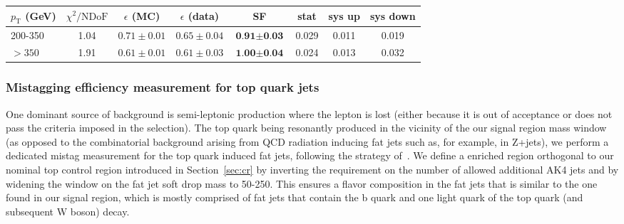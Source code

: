 \begin{table}[htbH]\footnotesize
  \begin{center}
  \begin{tabular}{  l | c  | c | c  | c | c | c | c }
  \hline
  \hline
     $p_\text{T}$ (GeV) & $\chi^2/\text{NDoF}$ & $\epsilon$ (MC) & $\epsilon$ (data) & \textbf{SF} &stat & sys up & sys down\\ \midrule
     \hline
200-350 & 1.04& $0.71\pm0.01$ & $0.65\pm0.04$ &  $\textbf{0.91}\pm\textbf{0.03}$ &  0.029 & 0.011 & 0.019\\ \hline

$>350$ & 1.91 & $0.61\pm0.01$ & $0.61\pm0.03$ & $\textbf{1.00}\pm\textbf{0.04}$ & 0.024 & 0.013 & 0.032\\ \hline
     \hline
     \hline
  \end{tabular}
  \end{center}
  \label{tab:Doubleb_FitParameters1}
\end{table}


\subsubsection{Mistagging efficiency measurement for top quark jets}


One dominant source of background is semi-leptonic \ttbar production where the lepton is lost (either because it is out of acceptance or does not pass the criteria imposed in the selection). The top quark being resonantly produced in the vicinity of the our signal region mass window (as opposed to the combinatorial background arising from QCD radiation inducing fat jets such as, for example, in Z+jets), we perform a dedicated mistag measurement for the top quark induced fat jets, following the strategy of~\cite{CMS-PAS-BTV-15-002}. We define a \ttbar enriched region orthogonal to our nominal top control region introduced in Section~\ref{sec:cr} by inverting the requirement on the number of allowed additional AK4 jets and by widening the window on the fat jet soft drop mass to 50-250\GeV. This ensures a flavor composition in the fat jets that is similar to the one found in our signal region, which is mostly comprised of fat jets that contain the b quark and one light quark of the top quark (and subsequent W boson) decay.


